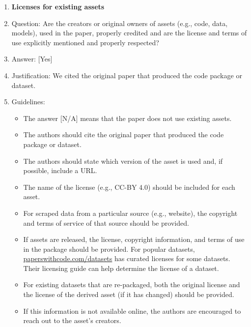 \documentclass{llmxive}
\providecommand{\answerYes}[1][]{[Yes]#1}
\providecommand{\answerNo}[1][]{[No]#1}
\providecommand{\answerNA}[1][]{[N/A]#1}
\begin{document}
{\begin{enumerate}
\item {\bf Licenses for existing assets}
    \item[] Question: Are the creators or original owners of assets (e.g., code, data, models), used in the paper, properly credited and are the license and terms of use explicitly mentioned and properly respected?
    \item[] Answer: \answerYes{} %
    \item[] Justification: We cited the original paper that produced the code package or dataset.
    \item[] Guidelines:
    \begin{itemize}
        \item The answer \answerNA{} means that the paper does not use existing assets.
        \item The authors should cite the original paper that produced the code package or dataset.
        \item The authors should state which version of the asset is used and, if possible, include a URL.
        \item The name of the license (e.g., CC-BY 4.0) should be included for each asset.
        \item For scraped data from a particular source (e.g., website), the copyright and terms of service of that source should be provided.
        \item If assets are released, the license, copyright information, and terms of use in the package should be provided. For popular datasets, \url{paperswithcode.com/datasets} has curated licenses for some datasets. Their licensing guide can help determine the license of a dataset.
        \item For existing datasets that are re-packaged, both the original license and the license of the derived asset (if it has changed) should be provided.
        \item If this information is not available online, the authors are encouraged to reach out to the asset's creators.
    \end{itemize}


\end{enumerate}}
\end{document}
